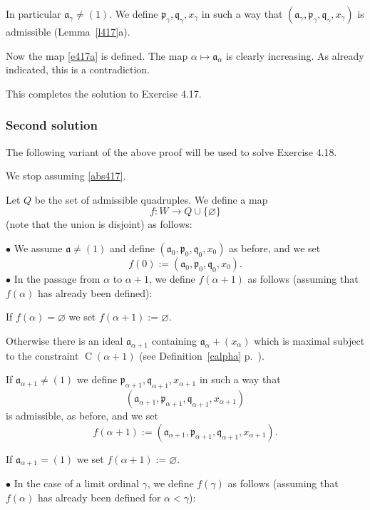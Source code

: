\documentclass[parskip=half,fontsize=12pt]{scrartcl}%
\newcommand{\oo}{\operatorname}\newcommand{\ooo}{\operatorname*}
\newcommand{\mf}{\mathfrak}
\newcommand{\aaa}{\mf a}
\newcommand{\ppp}{\mf p}
\newcommand{\qqq}{\mf q}
\newcommand{\bu}{\bullet}
\begin{document}
In particular $\aaa_\gamma\ne(1)$. We define $\ppp_\gamma,\qqq_\gamma,x_\gamma$ in such a way that $(\aaa_\gamma,\ppp_\gamma,\qqq_\gamma,x_\gamma)$ is admissible (Lemma~\ref{l417}a).

Now the map \eqref{e417a} is defined. The map $\alpha\mapsto\aaa_\alpha$ is clearly increasing. As already indicated, this is a contradiction.

This completes the solution to Exercise 4.17. %

\subsubsection{Second solution}\label{for418}%

The following variant of the above proof will be used to solve Exercise 4.18. %

We stop assuming \eqref{abs417}. 

Let $Q$ be the set of admissible quadruples. We define a map 
$$
f:W\to Q\cup\{\varnothing\}
$$ 
(note that the union is disjoint) as follows:

$\bu$ We assume $\aaa\ne(1)$ and define $(\aaa_0,\ppp_0,\qqq_0,x_0)$ as before, and we set 
$$
f(0):=(\aaa_0,\ppp_0,\qqq_0,x_0).
$$
$\bu$ In the passage from $\alpha$ to $\alpha+1$, we define $f(\alpha+1)$ as follows (assuming that $f(\alpha)$ has already been defined):

If $f(\alpha)=\varnothing$ we set $f(\alpha+1):=\varnothing$. 

Otherwise there is an ideal $\aaa_{\alpha+1}$ containing $\aaa_\alpha+(x_\alpha)$ which is maximal subject to the constraint $\oo C(\alpha+1)$ (see Definition~\ref{calpha} p.~\pageref{calpha}). 

If $\aaa_{\alpha+1}\ne(1)$ we define $\ppp_{\alpha+1},\qqq_{\alpha+1},x_{\alpha+1}$ in such a way that 
$$
(\aaa_{\alpha+1},\ppp_{\alpha+1},\qqq_{\alpha+1},x_{\alpha+1})
$$ 
is admissible, as before, and we set 
$$
f(\alpha+1):=(\aaa_{\alpha+1},\ppp_{\alpha+1},\qqq_{\alpha+1},x_{\alpha+1}).
$$ 

If $\aaa_{\alpha+1}=(1)$ we set $f(\alpha+1):=\varnothing$.

$\bu$ In the case of a limit ordinal $\gamma$, we define $f(\gamma)$ as follows (assuming that $f(\alpha)$ has already been defined for $\alpha<\gamma$):
\end{document}
